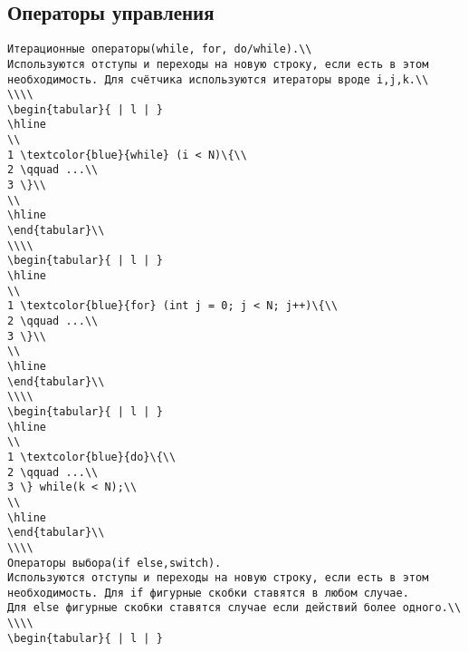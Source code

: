 \documentclass{article}
\begin{document}
\subsection{Операторы управления}
\begin{lstlisting}
Итерационные операторы(while, for, do/while).\\
Используются отступы и переходы на новую строку, если есть в этом необходимость. Для счётчика используются итераторы вроде i,j,k.\\
\\\\
\begin{tabular}{ | l | }
\hline
\\
1 \textcolor{blue}{while} (i < N)\{\\
2 \qquad ...\\
3 \}\\
\\
\hline
\end{tabular}\\
\\\\
\begin{tabular}{ | l | }
\hline
\\
1 \textcolor{blue}{for} (int j = 0; j < N; j++)\{\\
2 \qquad ...\\
3 \}\\
\\
\hline
\end{tabular}\\
\\\\
\begin{tabular}{ | l | }
\hline
\\
1 \textcolor{blue}{do}\{\\
2 \qquad ...\\
3 \} while(k < N);\\
\\
\hline
\end{tabular}\\
\\\\
Операторы выбора(if else,switch).
Используются отступы и переходы на новую строку, если есть в этом необходимость. Для if фигурные скобки ставятся в любом случае.
Для else фигурные скобки ставятся случае если действий более одного.\\
\\\\
\begin{tabular}{ | l | }

\end{lstlisting}
\end{document}
